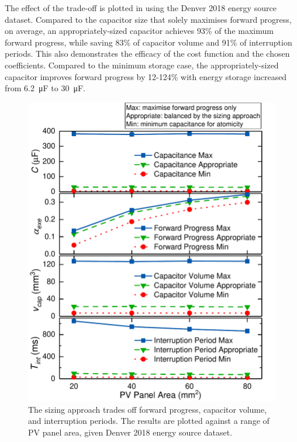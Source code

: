 The effect of the trade-off is plotted in  using the Denver 2018 energy source dataset. 
Compared to the capacitor size that solely maximises forward progress, on average, an appropriately-sized capacitor achieves 93\% of the maximum forward progress, while saving 83\% of capacitor volume and 91\% of interruption periods. 
This also demonstrates the efficacy of the cost function and the chosen coefficients. 
Compared to the minimum storage case, the appropriately-sized capacitor improves forward progress by 12-124\% with energy storage increased from \SI{6.2}{\micro\farad} to \SI{30}{\micro\farad}.

\begin{figure}
    \centering
    \includegraphics[width=\columnwidth]{ch4_sizingapproach/figures/Tradeoff3Fig}
    \caption{The sizing approach trades off forward progress, capacitor volume, and interruption periods. The results are plotted against a range of PV panel area, given Denver 2018 energy source dataset. }
    \label{fig:tradeoff}
\end{figure}

